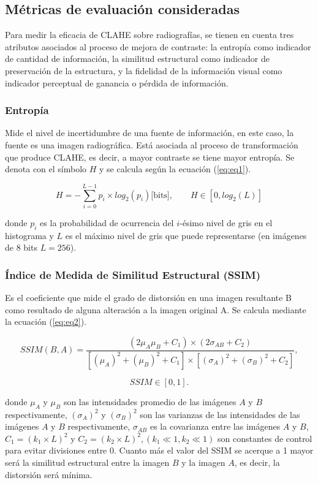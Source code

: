 \documentclass[sigplan,screen]{acmart}
\begin{document}
\subsection{Métricas de evaluación consideradas}
Para medir la eficacia de CLAHE sobre radiografías, se tienen en cuenta tres atributos asociados al proceso de mejora de contraste: la entropía como indicador de cantidad de información, la similitud estructural como indicador de preservación de la estructura, y la fidelidad de la información visual como indicador perceptual de ganancia o pérdida de información.

\subsubsection{Entropía \cite{Shannon1948}}
Mide el nivel de incertidumbre de una fuente de información, en este caso, la fuente es una imagen radiográfica. Está asociada al proceso de transformación que produce CLAHE, es decir, a mayor contraste se tiene mayor entropía. Se denota con el símbolo $H$ y se calcula según la ecuación (\ref{eq:eq1}).

\begin{equation}
   H=-\sum_{i=0}^{L-1}{p_i\times log_2(p_i)} \text{[bits]},\qquad H\in [0,log_2(L)]
\label{eq:eq1}
\end{equation}


\noindent donde $p_i$ es la probabilidad de ocurrencia del $i$-ésimo nivel de gris en el histograma y $L$ es el máximo nivel de gris que puede representarse (en imágenes de 8 bits $L=256$).

\subsubsection{Índice de Medida de Similitud Estructural (SSIM) \cite{Wang2004}}
Es el coeficiente que mide el grado de distorsión en una imagen resultante B como resultado de alguna alteración a la imagen original A. Se calcula mediante la ecuación (\ref{eq:eq2}).

\small{\begin{equation}
   SSIM(B,A)=\frac{(2\mu_A\mu_B+C_1)\times (2\sigma_{AB}+C_2)}{[(\mu_A)^2+(\mu_B)^2+C_1]\times [(\sigma_A)^2 +(\sigma_B)^2+C_2]},
\label{eq:eq2}
\end{equation}

\[
    SSIM \in [0,1].
\]
}


\noindent donde $\mu_A$ y $\mu_B$ son las intensidades promedio de las imágenes $A$ y $B$ respectivamente, $(\sigma_A)^2$ y $(\sigma_B)^2$ son las varianzas de las intensidades de las imágenes $A$ y $B$ respectivamente, $\sigma_{AB}$ es la covarianza entre las imágenes $A$ y $B$, $C_1=(k_1\times L)^2$ y $C_2=(k_2\times L)^2, (k_1\ll 1,k_2\ll 1)$  son constantes de control para evitar divisiones entre 0. Cuanto más el valor del SSIM se acerque a 1 mayor será la similitud estructural entre la imagen $B$ y la imagen $A$, es decir, la distorsión será mínima.
\end{document}
